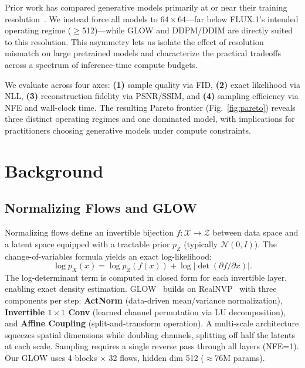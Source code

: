 \documentclass[10pt,twocolumn]{article}
\begin{document}
Prior work has compared generative models primarily at or near their training resolution~\cite{karras2019ffhq,heusel2017fid}. We instead force all models to $64\!\times\!64$---far below FLUX.1's intended operating regime ($\geq$512)---while GLOW and DDPM/DDIM are directly suited to this resolution. This asymmetry lets us isolate the effect of resolution mismatch on large pretrained models and characterize the practical tradeoffs across a spectrum of inference-time compute budgets.

We evaluate across four axes: \textbf{(1)} sample quality via FID, \textbf{(2)} exact likelihood via NLL, \textbf{(3)} reconstruction fidelity via PSNR/SSIM, and \textbf{(4)} sampling efficiency via NFE and wall-clock time. The resulting Pareto frontier (Fig.~\ref{fig:pareto}) reveals three distinct operating regimes and one dominated model, with implications for practitioners choosing generative models under compute constraints.

\section{Background}

\subsection{Normalizing Flows and GLOW}
Normalizing flows define an invertible bijection $f\!:\!\mathcal{X}\!\to\!\mathcal{Z}$ between data space and a latent space equipped with a tractable prior $p_Z$ (typically $\mathcal{N}(0,I)$). The change-of-variables formula yields an exact log-likelihood:
\[
\log p_X(x) = \log p_Z(f(x)) + \log\bigl|\det(\partial f/\partial x)\bigr|.
\]
The log-determinant term is computed in closed form for each invertible layer, enabling exact density estimation. GLOW~\cite{kingma2018glow} builds on RealNVP~\cite{dinh2016realnvp} with three components per step: \textbf{ActNorm} (data-driven mean/variance normalization), \textbf{Invertible $1\!\times\!1$ Conv} (learned channel permutation via LU decomposition), and \textbf{Affine Coupling} (split-and-transform operation). A multi-scale architecture squeezes spatial dimensions while doubling channels, splitting off half the latents at each scale. Sampling requires a single reverse pass through all layers (NFE=1). Our GLOW uses 4 blocks $\times$ 32 flows, hidden dim 512 ($\approx$76M params).
\end{document}
